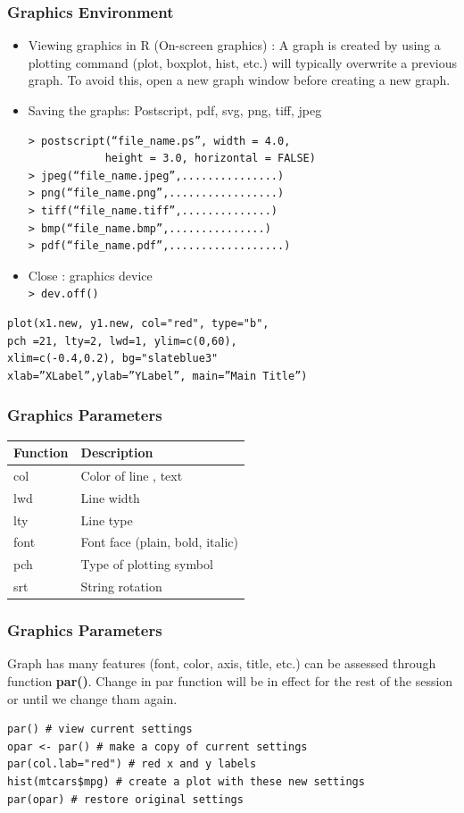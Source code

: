 \documentclass[12pt]{beamer}
\begin{document}
\begin{frame}[fragile]\frametitle{Graphics Environment}
\begin{itemize}
	\item Viewing graphics in R (On-screen graphics) : A graph is created by using a
	plotting command (plot, boxplot, hist, etc.) will typically overwrite a previous graph.
	To avoid this, open a new graph window before creating a new graph.
	\item Saving the graphs:	Postscript, pdf, svg, png, tiff, jpeg
	

\begin{verbatim}
> postscript(“file_name.ps”, width = 4.0, 
			height = 3.0, horizontal = FALSE)
> jpeg(“file_name.jpeg”,...............) 
> png(“file_name.png”,.................)
> tiff(“file_name.tiff”,..............) 
> bmp(“file_name.bmp”,...............)
> pdf(“file_name.pdf”,..................)
\end{verbatim}

\item Close : graphics device\\
\verb|> dev.off()|
\end{itemize}
\end{frame}

\begin{frame}[fragile]
\begin{verbatim}
plot(x1.new, y1.new, col="red", type="b", 
pch =21, lty=2, lwd=1, ylim=c(0,60),
xlim=c(-0.4,0.2), bg="slateblue3" 
xlab=”XLabel”,ylab=”YLabel”, main=”Main Title”)
\end{verbatim}
\end{frame}

\begin{frame}
\frametitle{Graphics Parameters}
\begin{tabular}{l|l}
	\textbf{Function} &\textbf{Description}\\ \hline
	col &Color of line , text\\
	lwd &Line width\\
	lty &Line type\\
	font &Font face (plain, bold, italic)\\
	pch &Type of plotting symbol\\
	srt &String rotation\\
\end{tabular}
\end{frame}

\begin{frame}[fragile]\frametitle{Graphics Parameters}
Graph has many features (font, color, axis, title, etc.) can be assessed through
function \textbf{par()}. Change in par function will be in effect for the rest of the session or until we
change tham again.
\begin{verbatim}
par() # view current settings
opar <- par() # make a copy of current settings
par(col.lab="red") # red x and y labels
hist(mtcars$mpg) # create a plot with these new settings
par(opar) # restore original settings
\end{verbatim}
\end{frame}
\end{document}
